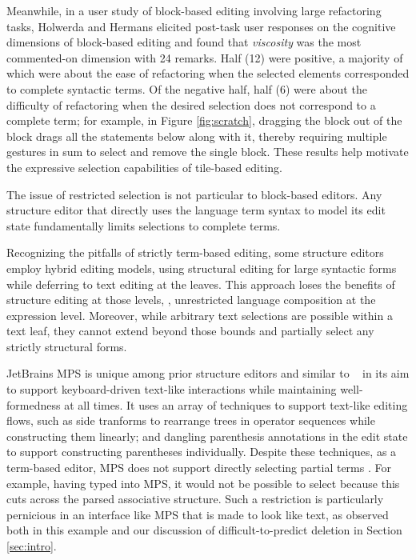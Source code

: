 Meanwhile, in a user study of block-based editing
involving large refactoring tasks,
Holwerda and Hermans elicited post-task user responses
on the cognitive dimensions of block-based editing and
found that \emph{viscosity} was the most commented-on
dimension with 24 remarks.
Half (12) were positive, a majority of which
were about the ease of refactoring when the selected
elements corresponded to complete syntactic terms.
Of the negative half, half (6) were about the difficulty
of refactoring when the desired selection
does not correspond to a complete term;
for example, in Figure \ref{fig:scratch}, dragging the  block out of
the  block drags all the statements below
along with it, thereby requiring multiple gestures
in sum to select and remove the single  block.
These results help motivate the expressive selection
capabilities of tile-based editing.

The issue of restricted selection is not particular to
block-based editors.
Any structure editor that directly uses the
language term syntax to model
its edit state fundamentally limits selections to complete
terms.


Recognizing the pitfalls of strictly term-based
editing, some structure editors
\cite{Cornell,greenfoot}
employ hybrid editing models, using structural editing
for large syntactic forms while deferring to text
editing at the leaves.
This approach loses the benefits of structure editing
at those levels, \eg, unrestricted language composition
at the expression level.
Moreover, while arbitrary text selections are possible
within a text leaf, they cannot extend beyond those
bounds and partially select any strictly structural forms.

JetBrains MPS \cite{DBLP:conf/icse/VoelterP12} is unique
among prior structure editors and similar to \tylr~ in
its aim to support keyboard-driven text-like interactions while
maintaining well-formedness at all times.
It uses an array of techniques to support text-like
editing flows, such as side tranforms to rearrange
trees in operator sequences while constructing them
linearly; and dangling parenthesis annotations in the
edit state to support constructing parentheses individually.
Despite these techniques, as a term-based editor, MPS
does not support directly selecting partial terms \cite{TowardUserFriendly}.
For example, having typed  into MPS, it would
not be possible to select  because this cuts
across the parsed associative structure.
Such a restriction is particularly pernicious in
an interface like MPS that is made to look like text, as observed
both in this example and our discussion of
difficult-to-predict deletion in Section \ref{sec:intro}.

